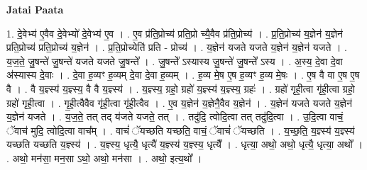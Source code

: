 \documentclass[17pt]{extarticle}
\begin{document}
\textbf{Jatai Paata} \newline

1. दे॒वेभ्य॑ ए॒वैव दे॒वेभ्यो॑ दे॒वेभ्य॑ ए॒व । . ए॒व प्र॑ति॒प्रोच्य॑ प्रति॒प्रो च्यै॒वैव प्र॑ति॒प्रोच्य॑ । . प्र॒ति॒प्रोच्य॑ य॒ज्ञेन॑ य॒ज्ञेन॑ प्रति॒प्रोच्य॑ प्रति॒प्रोच्य॑ य॒ज्ञेन॑ । . प्र॒ति॒प्रोच्येति॑ प्रति - प्रोच्य॑ । . य॒ज्ञेन॑ यजते यजते य॒ज्ञेन॑ य॒ज्ञेन॑ यजते । . य॒ज॒ते॒ जु॒षन्ते॑ जु॒षन्ते॑ यजते यजते जु॒षन्ते᳚ । . जु॒षन्ते᳚ ऽस्यास्य जु॒षन्ते॑ जु॒षन्ते᳚ ऽस्य । . अ॒स्य॒ दे॒वा दे॒वा अ॑स्यास्य दे॒वाः । . दे॒वा ह॒व्यꣳ ह॒व्यम् दे॒वा दे॒वा ह॒व्यम् । . ह॒व्य मे॒ष ए॒ष ह॒व्यꣳ ह॒व्य मे॒षः । . ए॒ष वै वा ए॒ष ए॒ष वै । . वै य॒ज्ञ्स्य॑ य॒ज्ञ्स्य॒ वै वै य॒ज्ञ्स्य॑ । . य॒ज्ञ्स्य॒ ग्रहो॒ ग्रहो॑ य॒ज्ञ्स्य॑ य॒ज्ञ्स्य॒ ग्रहः॑ । . ग्रहो॑ गृही॒त्वा गृ॑ही॒त्वा ग्रहो॒ ग्रहो॑ गृही॒त्वा । . गृ॒ही॒त्वैवैव गृ॑ही॒त्वा गृ॑ही॒त्वैव । . ए॒व य॒ज्ञेन॑ य॒ज्ञेनै॒वैव य॒ज्ञेन॑ । . य॒ज्ञेन॑ यजते यजते य॒ज्ञेन॑ य॒ज्ञेन॑ यजते । . य॒ज॒ते॒ तत् तद् य॑जते यजते॒ तत् । . तदु॑दि॒ त्वोदि॒त्वा तत् तदु॑दि॒त्वा । . उ॒दि॒त्वा वाचं॒ ॅवाच॑ मुदि॒ त्वोदि॒त्वा वाच᳚म् । . वाचं॑ ॅयच्छति यच्छति॒ वाचं॒ ॅवाचं॑ ॅयच्छति । . य॒च्छ॒ति॒ य॒ज्ञ्स्य॑ य॒ज्ञ्स्य॑ यच्छति यच्छति य॒ज्ञ्स्य॑ । . य॒ज्ञ्स्य॒ धृत्यै॒ धृत्यै॑ य॒ज्ञ्स्य॑ य॒ज्ञ्स्य॒ धृत्यै᳚ । . धृत्या॒ अथो॒ अथो॒ धृत्यै॒ धृत्या॒ अथो᳚ । . अथो॒ मन॑सा॒ मन॒सा ऽथो॒ अथो॒ मन॑सा । . अथो॒ इत्य॒थो᳚ । \newline
\end{document}
